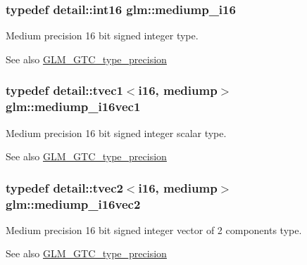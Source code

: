 \subsubsection[{\texorpdfstring{mediump\+\_\+i16}{mediump_i16}}]{\setlength{\rightskip}{0pt plus 5cm}typedef detail\+::int16 {\bf glm\+::mediump\+\_\+i16}}\hypertarget{group__gtc__type__precision_ga8454fc6a82c7bb787d0ac9663e08f63d}{}\label{group__gtc__type__precision_ga8454fc6a82c7bb787d0ac9663e08f63d}
Medium precision 16 bit signed integer type. \begin{DoxySeeAlso}{See also}
\hyperlink{group__gtc__type__precision}{G\+L\+M\+\_\+\+G\+T\+C\+\_\+type\+\_\+precision} 
\end{DoxySeeAlso}
\subsubsection[{\texorpdfstring{mediump\+\_\+i16vec1}{mediump_i16vec1}}]{\setlength{\rightskip}{0pt plus 5cm}typedef detail\+::tvec1$<$i16, mediump$>$ {\bf glm\+::mediump\+\_\+i16vec1}}\hypertarget{group__gtc__type__precision_ga6a1d37139ea8990de24edf4bfa3500ad}{}\label{group__gtc__type__precision_ga6a1d37139ea8990de24edf4bfa3500ad}
Medium precision 16 bit signed integer scalar type. \begin{DoxySeeAlso}{See also}
\hyperlink{group__gtc__type__precision}{G\+L\+M\+\_\+\+G\+T\+C\+\_\+type\+\_\+precision} 
\end{DoxySeeAlso}
\subsubsection[{\texorpdfstring{mediump\+\_\+i16vec2}{mediump_i16vec2}}]{\setlength{\rightskip}{0pt plus 5cm}typedef detail\+::tvec2$<$i16, mediump$>$ {\bf glm\+::mediump\+\_\+i16vec2}}\hypertarget{group__gtc__type__precision_ga664a0266910df3c2d6559651f94d32e6}{}\label{group__gtc__type__precision_ga664a0266910df3c2d6559651f94d32e6}
Medium precision 16 bit signed integer vector of 2 components type. \begin{DoxySeeAlso}{See also}
\hyperlink{group__gtc__type__precision}{G\+L\+M\+\_\+\+G\+T\+C\+\_\+type\+\_\+precision} 
\end{DoxySeeAlso}
